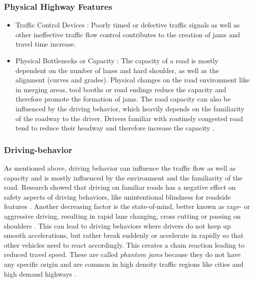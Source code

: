 \subsubsection{Physical Highway Features}

\begin{itemize}
	\item Traffic Control Devices : Poorly timed or defective traffic signals as well as other ineffective traffic flow control contributes to the creation of jams and travel time increase.
	\item Physical Bottlenecks or Capacity : The capacity of a road is mostly dependent on the number of lanes and hard shoulder, as well as the alignment (curves and grades). Physical changes on the road environment like in merging areas, tool booths or road endings reduce the capacity and therefore promote the formation of jams. The road capacity can also be influenced by the driving behavior, which heavily depends on the familiarity of the roadway to the driver. Drivers familiar with routinely congested road tend to reduce their headway and therefore increase the capacity \parencite{Charlton2013}.
\end{itemize}

\subsubsection{Driving-behavior}
As mentioned above, driving behavior can influence the traffic flow as well as capacity and is mostly influenced by the environment and the familiarity of the road. Research showed that driving on familiar roads has a negative effect on safety aspects of driving behaviors, like unintentional blindness for roadside features \parencite{Charlton2013}. Another decreasing factor is the state-of-mind, better known as rage- or aggressive driving, resulting in rapid lane changing, cross cutting or passing on shoulders \parencite{Shinar2004}. This can lead to driving behaviors where drivers do not keep up smooth accelerations, but rather break suddenly or accelerate in rapidly so that other vehicles need to react accordingly. This creates a chain reaction leading to reduced travel speed. These are called \textit{phantom jams} because they do not have any specific origin and are common in high density traffic regions like cities and high demand highways \parencite{ASTRA2020}.

\bigskip

